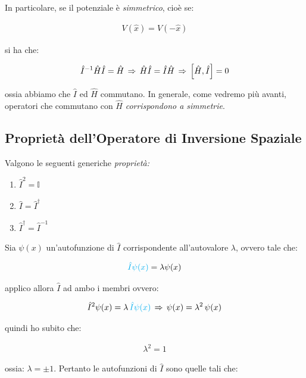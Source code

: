 	In particolare, se il potenziale è \textit{simmetrico}, cioè se:
	
\begin{align*}
	V(\hat{x}) = V(-\hat{x})
\end{align*}

	si ha che:
	
\begin{align*}
	 \hat{I}^{-1}\hat{H}\hat{I}= \hat{H} \, \Rightarrow \, \hat{H}\hat{I} = \hat{I}\hat{H} \, \Rightarrow \, \qty[\hat{H}, \hat{I}] = 0
\end{align*}
	
	ossia abbiamo che $\hat{I}$ ed $\hat{H}$ commutano. In generale, come vedremo più avanti, operatori che commutano con $\hat{H}$ \textit{corrispondono a simmetrie}.

\subsection{Proprietà dell'Operatore di Inversione Spaziale}

\begin{nb}
	Valgono le seguenti generiche \textit{proprietà:}
\begin{enumerate}[label=\arabic*)]
	\item $\hat{I}^2 = \mathbb{I}$ 
	\item $\hat{I} = \hat{I}^{\dagger}$
	\item $\hat{I}^{\dagger} = \hat{I}^{-1}$
\end{enumerate}
\end{nb}

	Sia $\psi(x)$ un'autofunzione di $\hat{I}$ corrispondente all'autovalore $\lambda$, ovvero tale che:
	
\begin{align*}
	\textcolor{cyan}{\hat{I}\psi(x)} = \lambda \psi(x)
\end{align*}

	applico allora $\hat{I}$ ad ambo i membri ovvero:

\begin{align*}
	\hat{I}^2\psi(x) = \lambda \, \textcolor{cyan}{\hat{I}\psi(x)} \, \Rightarrow \, \psi(x) = \lambda^2 \, \psi(x)
\end{align*}

	quindi ho subito che:
	
\begin{align*}
	\lambda^2 = 1
\end{align*}

	ossia: $\lambda = \pm 1$. Pertanto le autofunzioni di $\hat{I}$ sono quelle tali che:
	
